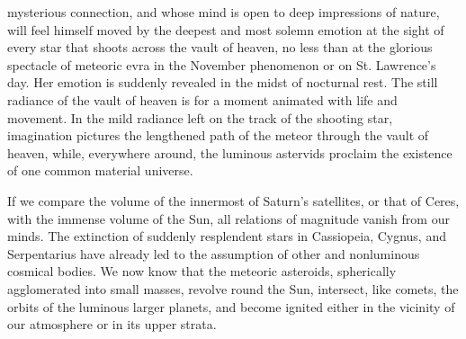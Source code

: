 mysterious connection, and whose mind is open to deep impressions of nature, will feel himself moved by the deepest and most solemn emotion at the sight of every star that shoots across the vault of heaven, no less than at the glorious spectacle of meteoric evra in the November phenomenon or on St. Lawrence's day. Her emotion is suddenly revealed in the midst of nocturnal rest. The still radiance of the vault of heaven is for a moment animated with life and movement. In the mild radiance left on the track of the shooting star, imagination pictures the lengthened path of the meteor through the vault of heaven, while, everywhere around, the luminous astervids proclaim the existence of one common material universe.

If we compare the volume of the innermost of Saturn's satellites, or that of Ceres, with the immense volume of the Sun, all relations of magnitude vanish from our minds. The extinction of suddenly resplendent stars in Cassiopeia, Cygnus, and Serpentarius have already led to the assumption of other and nonluminous cosmical bodies. We now know that the meteoric asteroids, spherically agglomerated into small masses, revolve round the Sun, intersect, like comets, the orbits of the luminous larger planets, and become ignited either in the vicinity of our atmosphere or in its upper strata.

